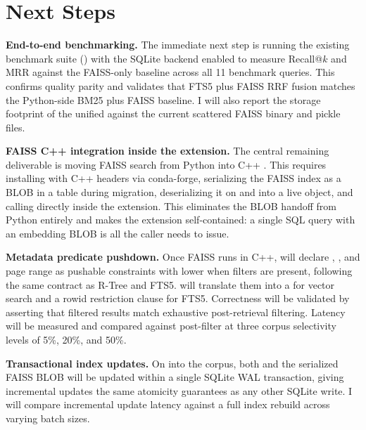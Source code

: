 \documentclass[sigconf,11pt]{acmart}
\begin{document}
\section{Next Steps}

\textbf{End-to-end benchmarking.} The immediate next step is running the
existing benchmark suite () with the SQLite
backend enabled to measure Recall@$k$ and MRR against the FAISS-only baseline
across all 11 benchmark queries. This confirms quality parity and validates that
FTS5 plus FAISS RRF fusion matches the Python-side BM25 plus FAISS baseline. I
will also report the storage footprint of the unified 
against the current scattered FAISS binary and pickle files.

\textbf{FAISS C++ integration inside the extension.} The central remaining
deliverable is moving FAISS search from Python into C++ . This
requires installing  with C++ headers via conda-forge,
serializing the FAISS index as a BLOB in a  table during
migration, deserializing it on  and  into a live
 object, and calling  directly inside
the extension. This eliminates the BLOB handoff from Python entirely and makes
the extension self-contained: a single SQL query with an embedding BLOB is all
the caller needs to issue.

\textbf{Metadata predicate pushdown.} Once FAISS runs in C++,
 will declare , , and page
range as pushable constraints with lower  when filters are
present, following the same contract as R-Tree and FTS5.  will
translate them into a  for vector search and a
rowid restriction clause for FTS5. Correctness will be validated by asserting
that filtered results match exhaustive post-retrieval filtering. Latency will be
measured and compared against post-filter at three corpus selectivity levels of
5\%, 20\%, and 50\%.

\textbf{Transactional index updates.} On  into the corpus, both
 and the serialized FAISS BLOB will be updated within a single
SQLite WAL transaction, giving incremental updates the same atomicity guarantees
as any other SQLite write. I will compare incremental update latency against a
full index rebuild across varying batch sizes.

\clearpage

\appendix
\end{document}
